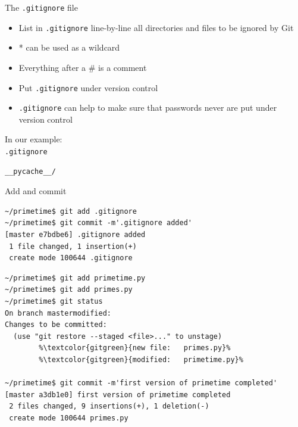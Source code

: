 \documentclass[svgnames]{beamer}
\begin{document}
\begin{frame}[fragile]{The \texttt{.gitignore} file}
 \begin{itemize}
  \item List in \texttt{.gitignore} line-by-line all directories and files to
	be ignored by Git
  \item * can be used as a wildcard
  \item Everything after a \# is a comment
  \item Put \texttt{.gitignore} under version control
  \item \texttt{.gitignore} can help to make sure that passwords never are put
	under version control
 \end{itemize}

 \vspace{0.3truecm}
 In our example:\\
 \texttt{.gitignore}
 \begin{lstlisting}
__pycache__/
 \end{lstlisting}
\end{frame}

\begin{frame}[fragile]{Add and commit}
 \begin{lstlisting}
~/primetime$ git add .gitignore
~/primetime$ git commit -m'.gitignore added'
[master e7bdbe6] .gitignore added
 1 file changed, 1 insertion(+)
 create mode 100644 .gitignore
 \end{lstlisting}
 \begin{lstlisting}[escapechar=\%]
~/primetime$ git add primetime.py
~/primetime$ git add primes.py
~/primetime$ git status
On branch mastermodified:   
Changes to be committed:
  (use "git restore --staged <file>..." to unstage)
        %\textcolor{gitgreen}{new file:   primes.py}%
        %\textcolor{gitgreen}{modified:   primetime.py}%

~/primetime$ git commit -m'first version of primetime completed'
[master a3db1e0] first version of primetime completed
 2 files changed, 9 insertions(+), 1 deletion(-)
 create mode 100644 primes.py
 \end{lstlisting}
\end{frame}
\end{document}
